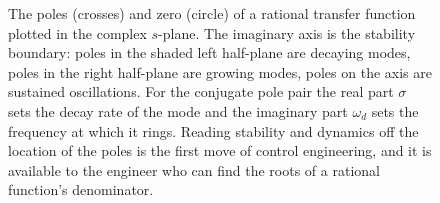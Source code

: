 \begin{figure}[htbp]
{}%
\caption[The pole-zero map read as a system preview]{The poles
(crosses) and zero (circle) of a rational transfer function plotted in
the complex $s$-plane. The imaginary axis is the stability boundary:
poles in the shaded left half-plane are decaying modes, poles in the
right half-plane are growing modes, poles on the axis are sustained
oscillations. For the conjugate pole pair the real part $\sigma$ sets
the decay rate of the mode and the imaginary part $\omega_{d}$ sets the
frequency at which it rings. Reading stability and dynamics off the
location of the poles is the first move of control engineering, and it
is available to the engineer who can find the roots of a rational
function's denominator.}
\label{fig:vol02:ch02:pole-zero-map}
\end{figure}
